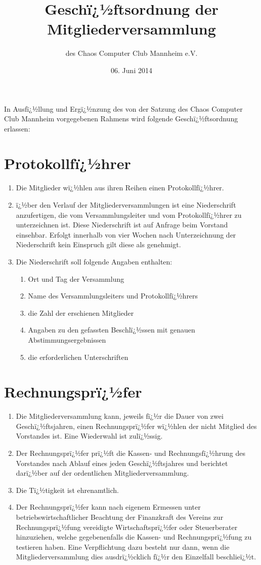 \documentclass[a4paper, 12pt]{scrartcl}
\title{Geschï¿½ftsordnung der Mitgliederversammlung}
\subtitle{des Chaos Computer Club Mannheim e.V.}
\author{}
\date{06. Juni 2014}
\begin{document}
\maketitle

In Ausfï¿½llung und Ergï¿½nzung des von der Satzung des Chaos Computer Club
Mannheim vorgegebenen Rahmens wird folgende Geschï¿½ftsordnung erlassen:

\section{Protokollfï¿½hrer}
\begin{enumerate}
	\item Die Mitglieder wï¿½hlen aus ihren Reihen einen Protokollfï¿½hrer.
	\item ï¿½ber den Verlauf der Mitgliederversammlungen ist eine Niederschrift anzufertigen, die vom Versammlungsleiter und vom Protokollfï¿½hrer zu unterzeichnen ist. Diese Niederschrift ist auf Anfrage beim Vorstand einsehbar. Erfolgt innerhalb von vier Wochen nach Unterzeichnung der Niederschrift kein Einspruch gilt diese als genehmigt.
	\item Die Niederschrift soll folgende Angaben enthalten:
		\begin{enumerate}
	  	\item Ort und Tag der Versammlung
	    \item Name des Versammlungsleiters und Protokollfï¿½hrers
	    \item die Zahl der erschienen Mitglieder
	    \item Angaben zu den gefassten Beschlï¿½ssen mit genauen Abstimmungsergebnissen
	    \item die erforderlichen Unterschriften
		\end{enumerate}
\end{enumerate}

\section{Rechnungsprï¿½fer}
\begin{enumerate}
	\item Die Mitgliederversammlung kann, jeweils fï¿½r die Dauer von zwei
Geschï¿½ftsjahren, einen Rechnungsprï¿½fer wï¿½hlen der nicht Mitglied des
Vorstandes ist. Eine Wiederwahl ist zulï¿½ssig.
	\item Der Rechnungsprï¿½fer prï¿½ft die Kassen- und Rechnungsfï¿½hrung des
Vorstandes nach Ablauf eines jeden Geschï¿½ftsjahres und berichtet darï¿½ber
auf der ordentlichen Mitgliederversammlung.
	\item Die Tï¿½tigkeit ist ehrenamtlich.
	\item Der Rechnungsprï¿½fer kann nach eigenem Ermessen unter
betriebswirtschaftlicher Beachtung der Finanzkraft des Vereins zur
Rechnungsprï¿½fung vereidigte Wirtschaftsprï¿½fer oder Steuerberater
hinzuziehen, welche gegebenenfalls die Kassen- und Rechnungsprï¿½fung zu
testieren haben. Eine Verpflichtung dazu besteht nur dann, wenn die
Mitgliederversammlung dies ausdrï¿½cklich fï¿½r den Einzelfall beschlieï¿½t.
\end{enumerate}
\end{document}
